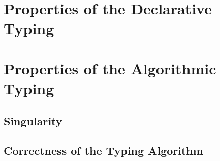 \documentclass[acmsmall,natbib=false,review,anonymous]{acmart}
\newcommand{\genDir}{_gen}
\begin{document}
\section{Properties of the Declarative Typing}





\section{Properties of the Algorithmic Typing}

\subsection{Singularity}


\subsection{Correctness of the Typing Algorithm}


\printbibliography
\end{document}
